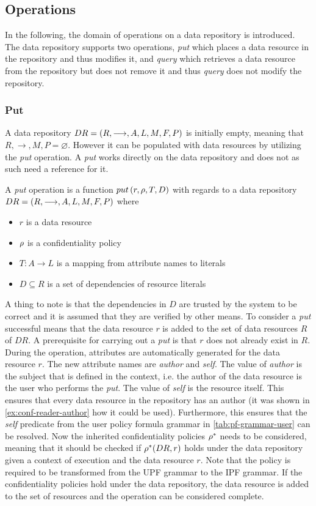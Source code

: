 \subsection{Operations}
In the following, the domain of operations on a data repository is introduced. The data repository supports two operations, \emph{put} which places a data resource in the repository and thus modifies it, and \emph{query} which retrieves a data resource from the repository but does not remove it and thus \emph{query} does not modify the repository.

\subsubsection{Put}\label{sec:put}
A data repository $DR= \left( R, \longrightarrow, A, L, M, F, P \right)$ is initially empty, meaning that $R, \longrightarrow, M, P = \varnothing$. However it can be populated with data resources by utilizing the \emph{put} operation. A \emph{put} works directly on the data repository and does not as such need a reference for it.
\begin{definition}
A \emph{put} operation is a function $put \left( r, \rho, T, D \right)$ with regards to a data repository $DR= \left( R, \longrightarrow, A, L, M, F, P \right)$ where
\begin{itemize}
  \item $r$ is a data resource
  \item $\rho$ is a confidentiality policy
  \item $T : A \rightarrow L$ is a mapping from attribute names to literals
  \item $D \subseteq R$ is a set of dependencies of resource literals
\end{itemize}
\end{definition}
A thing to note is that the dependencies in $D$ are trusted by the system to be correct and it is assumed that they are verified by other means. To consider a \emph{put} successful means that the data resource $r$ is added to the set of data resources $R$ of $DR$. A prerequisite for carrying out a \emph{put} is that $r$ does not already exist in $R$. During the operation, attributes are automatically generated for the data resource $r$. The new attribute names are \emph{author} and \emph{self}. The value of \emph{author} is the subject that is defined in the context, i.e. the author of the data resource is the user who performs the \emph{put}. The value of \emph{self} is the resource itself. This ensures that every data resource in the repository has an author (it was shown in \autoref{ex:conf-reader-author} how it could be used). Furthermore, this ensures that the \emph{self} predicate from the user policy formula grammar in \autoref{tab:pf-grammar-user} can be resolved. Now the inherited confidentiality policies $\rho^{\ast}$ needs to be considered, meaning that it should be checked if $\rho^{\ast}(DR,r)$ holds under the data repository given a context of execution and the data resource $r$. Note that the policy is required to be transformed from the UPF grammar to the IPF grammar. If the confidentiality policies hold under the data repository, the data resource is added to the set of resources and the operation can be considered complete.
